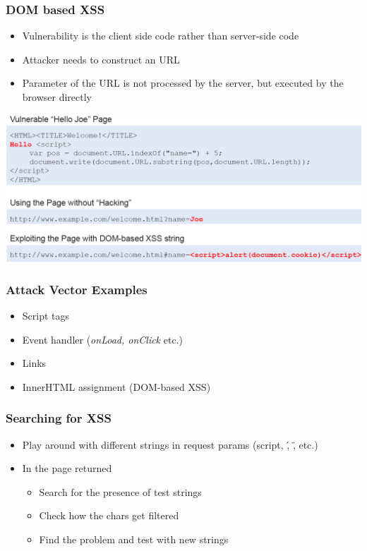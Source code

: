 \subsubsection{DOM based XSS}
\begin{itemize}
    \item Vulnerability is the client side code rather than server-side code
    \item Attacker needs to construct an URL
    \item Parameter of the URL is not processed by the server, but executed by the browser directly
\end{itemize}
\includegraphics[width=\linewidth]{../img/xss_dom.png}

\subsubsection{Attack Vector Examples}
\begin{itemize}
    \item Script tags
    \item Event handler (\textit{onLoad, onClick} etc.)
    \item Links
    \item InnerHTML assignment (DOM-based XSS)
\end{itemize}

\subsubsection{Searching for XSS}
\begin{itemize}
    \item Play around with different strings in request params (script, \', \", etc.)
    \item In the page returned
    \begin{itemize}
        \item Search for the presence of test strings
        \item Check how the chars get filtered
        \item Find the problem and test with new strings
    \end{itemize}
\end{itemize}


